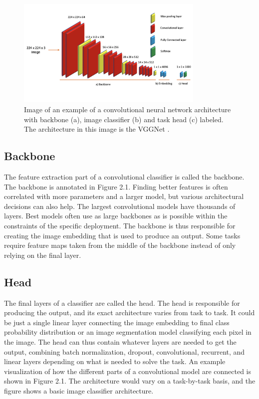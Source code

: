 \begin{figure}[h!] 
\centering 
\includegraphics[width=0.8\textwidth]{imgs/vggnet.png}
\caption{Image of an example of a convolutional neural network architecture with backbone (a), image classifier (b) and task head (c) labeled. The architecture in this image is the VGGNet \citep{VGG}.}
\end{figure}

\subsection{Backbone}
The feature extraction part of a convolutional classifier is called the backbone.
The backbone is annotated in Figure 2.1.
Finding better features is often correlated with more parameters and a larger model, but various architectural decisions can also help.
The largest convolutional models have thousands of layers.
Best models often use as large backbones as is possible within the constraints of the specific deployment.
The backbone is thus responsible for creating the image embedding that is used to produce an output.
Some tasks require feature maps taken from the middle of the backbone instead of only relying on the final layer.

\subsection{Head}
The final layers of a classifier are called the head.
The head is responsible for producing the output, and its exact architecture varies from task to task.
It could be just a single linear layer connecting the image embedding to final class probability distribution or an image segmentation model classifying each pixel in the image.
The head can thus contain whatever layers are needed to get the output, combining batch normalization, dropout, convolutional, recurrent, and linear layers depending on what is needed to solve the task.
An example visualization of how the different parts of a convolutional model are connected is shown in Figure 2.1.
The architecture would vary on a task-by-task basis, and the figure shows a basic image classifier architecture.
